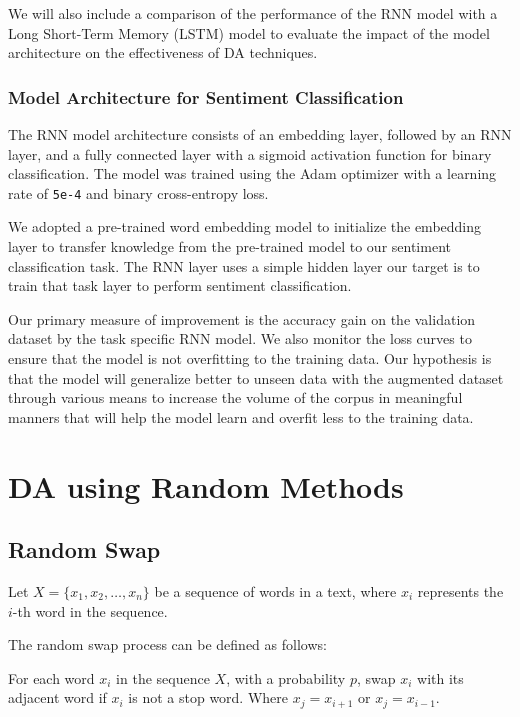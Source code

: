 \documentclass[10pt]{extarticle}
\newcommand{\code}[1]{\texttt{#1}}
\begin{document}
We will also include a comparison of the performance of the RNN model with a
Long Short-Term Memory (LSTM) model to evaluate the impact of the model
architecture on the effectiveness of DA techniques.

\subsubsection{Model Architecture for Sentiment Classification}

The RNN model architecture consists of an embedding layer, followed by an RNN
layer, and a fully connected layer with a sigmoid activation function for
binary classification. The model was trained using the Adam optimizer with a
learning rate of \code{5e-4} and binary cross-entropy loss.

We adopted a pre-trained word embedding model to initialize the embedding layer
to transfer knowledge from the pre-trained model to our sentiment
classification task. The RNN layer uses a simple hidden layer our target is to
train that task layer to perform sentiment classification.

Our primary measure of improvement is the accuracy gain on the validation
dataset by the task specific RNN model. We also monitor the loss curves to
ensure that the model is not overfitting to the training data. Our hypothesis
is that the model will generalize better to unseen data with the augmented
dataset through various means to increase the volume of the corpus in
meaningful manners that will help the model learn and overfit less to the
training data.

\section{DA using Random Methods}

\subsection{Random Swap}

Let \( X = \{x_1, x_2, \ldots, x_n\} \) be a sequence of words in a text, where
\( x_i \) represents the \( i \)-th word in the sequence.

The random swap process can be defined as follows:

For each word \( x_i \) in the sequence \( X \), with a probability \( p \),
swap \( x_i \) with its adjacent word if \( x_i \) is not a stop word. Where \(
x_j = x_{i+1} \) or \( x_j = x_{i-1} \).
\end{document}
